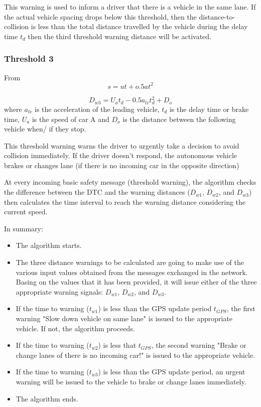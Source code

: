 \documentclass[12pt]{report}
\begin{document}
This warning is used to inform a driver that there is a vehicle in the same lane. If the actual vehicle spacing drops below this threshold, then the distance-to-collision is less than the total distance travelled by the vehicle during the delay time $t_d$ then the third threshold warning distance will be activated.


\subsubsection{Threshold 3}
From 
\begin{equation}
	s = ut + o.5at^2
\end{equation}

\begin{equation}
	{D_{w3}} = U_a t_d - 0.5{a_{lv}} t_d^2 + D_o
\end{equation}
where $a_{lv}$ is the acceleration of the leading vehicle, $t_d$ is the delay time or brake time, $U_a$ is the speed of car A and $D_o$ is the distance between the following vehicle when/ if they stop.


This threshold warning warns the driver to urgently take a decision to avoid collision immediately. If the driver doesn’t respond, the autonomous vehicle brakes or changes lane (if there is no incoming car in the opposite direction)

At every incoming basic safety message (threshold warning), the algorithm checks the difference between the DTC and the warning distances ($D_{w1}$, $D_{w2}$, and $D_{w3}$) then calculates the time interval to reach the warning distance considering the current speed.

In summary: 
\begin{itemize}
	\item The algorithm starts.
	\item The three distance warnings to be calculated are going to make use of the various input values obtained from the messages exchanged in the network. Basing on the values that it has been provided, it will issue either of the three appropriate warning signals: $D_{w1}$, $D_{w2}$, and $D_{w3}$.
	\item  If the time to warning ($t_{w1}$) is less than the GPS update period $t_{GPS}$, the first warning "Slow down vehicle on same lane" is issued to the appropriate vehicle. If not, the algorithm proceeds. 
	\item If the time to warning ($t_{w2}$) is less that $t_{GPS}$, the second warning "Brake or change lanes of there is no incoming car!" is issued to the appropriate vehicle.
	\item If the time to warning ($t_{w3}$) is less than the GPS update period, an urgent warning will be issued to the vehicle to brake or change lanes immediately.
	\item The algorithm ends.
\end{itemize}
   
\end{document}
